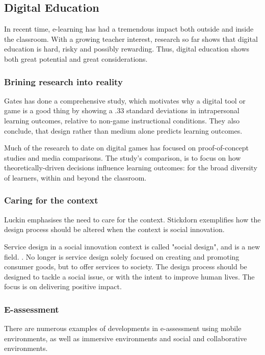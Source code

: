     

    \subsection{Digital Education}

    In recent time, e-learning has had a tremendous impact both outside and inside the classroom. With a growing teacher interest, research so far shows that digital education is hard, risky and possibly rewarding. Thus, digital education shows both great potential and great considerations.

    \subsubsection{Brining research into reality}

    Gates \cite{gates} has done a comprehensive study, which motivates why a digital tool or game is a good thing by showing a .33 standard deviations in intrapersonal learning outcomes, relative to non-game instructional conditions. They also conclude, that design rather than medium alone predicts learning outcomes.

    Much of the research to date on digital games has focused on proof-of-concept studies and media comparisons. The study's comparison, is to focus on how theoretically-driven decisions influence learning outcomes: for the broad diversity of learners, within and beyond the classroom.

    \subsubsection{Caring for the context}
    Luckin \cite{luckin} emphasises the need to care for the context. Stickdorn \cite{stickdorn} exemplifies how the design process should be altered when the context is social innovation.

    Service design in a social innovation context is called "social design", and is a new field. \cite{stickdorn}. No longer is service design solely focused on creating and promoting consumer goods, but to offer services to society. The design process should be designed to tackle a social issue, or with the intent to improve human lives. The focus is on delivering positive impact.

    \subsubsection{E-assessment}
    There are numerous examples of developments in e-assessment using mobile environments, as well as immersive environments and social and collaborative environments.

